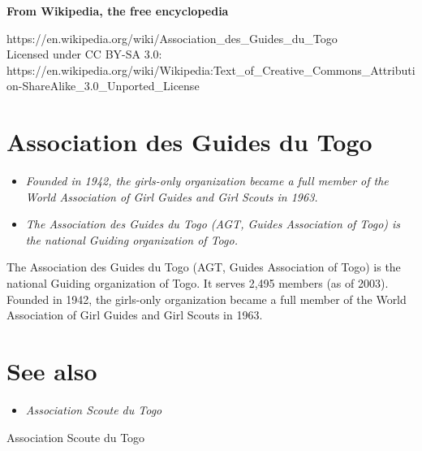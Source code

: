 \textbf{From Wikipedia, the free encyclopedia}

https://en.wikipedia.org/wiki/Association\_des\_Guides\_du\_Togo\\
Licensed under CC BY-SA 3.0:\\
https://en.wikipedia.org/wiki/Wikipedia:Text\_of\_Creative\_Commons\_Attribution-ShareAlike\_3.0\_Unported\_License

\section{Association des Guides du
Togo}\label{association-des-guides-du-togo}

\begin{itemize}
\item
  \emph{Founded in 1942, the girls-only organization became a full
  member of the World Association of Girl Guides and Girl Scouts in
  1963.}
\item
  \emph{The Association des Guides du Togo (AGT, Guides Association of
  Togo) is the national Guiding organization of Togo.}
\end{itemize}

The Association des Guides du Togo (AGT, Guides Association of Togo) is
the national Guiding organization of Togo. It serves 2,495 members (as
of 2003). Founded in 1942, the girls-only organization became a full
member of the World Association of Girl Guides and Girl Scouts in 1963.

\section{See also}\label{see-also}

\begin{itemize}
\item
  \emph{Association Scoute du Togo}
\end{itemize}

Association Scoute du Togo
